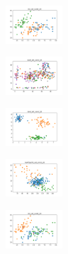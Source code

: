 \begin{figure}[H]    
    \centering
    \begin{subfigure}
        \centering
        \includegraphics[width=0.234\textwidth]{img/hs-ls-v2/iris_set_const_20_949004259_clust.png}
    \end{subfigure}
    \hfill
    \begin{subfigure}
        \centering
        \includegraphics[width=0.234\textwidth]{img/hs-ls-v2/ecoli_set_const_20_949004259_clust.png}
    \end{subfigure}
    \hfill
    \begin{subfigure}
        \centering
        \includegraphics[width=0.234\textwidth]{img/hs-ls-v2/rand_set_const_20_949004259_clust.png}
    \end{subfigure}
    \hfill
    \begin{subfigure}
        \centering
        \includegraphics[width=0.234\textwidth]{img/hs-ls-v2/newthyroid_set_const_20_949004259_clust.png}
    \end{subfigure}
    \hfill
    \begin{subfigure}
        \centering
        \includegraphics[width=0.234\textwidth]{img/hs-ls-v2/iris_set_const_20_589741062_clust.png}
    \end{subfigure}

\end{figure}
